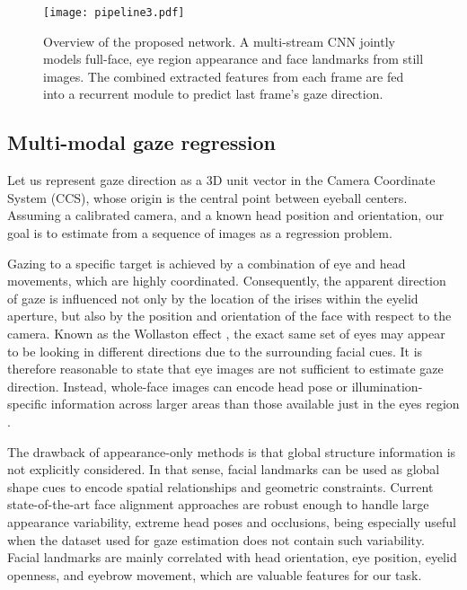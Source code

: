 \documentclass{bmvc2k}
\begin{document}
\begin{figure}
	\begin{center}
		\texttt{[image: pipeline3.pdf]}
	\end{center}
	\caption{Overview of the proposed network. A multi-stream CNN jointly models full-face, eye region appearance and face landmarks from still images. The combined extracted features from each frame are fed into a recurrent module to predict last frame's gaze direction.}
	\label{fig:architecture}\end{figure}


\subsection{Multi-modal gaze regression}

Let us represent gaze direction as a 3D unit vector  in the Camera Coordinate System (CCS), whose origin is the central point between eyeball centers. Assuming a calibrated camera, and a known head position and orientation, our goal is to estimate  from a sequence of images  as a regression problem. 

Gazing to a specific target is achieved by a combination of eye and head movements, which are highly coordinated. Consequently, the apparent direction of gaze is influenced not only by the location of the irises within the eyelid aperture, but also by the position and orientation of the face with respect to the camera. Known as the Wollaston effect \cite{wollaston1824xiii}, the exact same set of eyes may appear to be looking in different directions due to the surrounding facial cues. It is therefore reasonable to state that eye images are not sufficient to estimate gaze direction. Instead, whole-face images can encode head pose or illumination-specific information across larger areas than those available just in the eyes region \cite{zhang2017s, krafka2016eye}. 

The drawback of appearance-only methods is that global structure information is not explicitly considered. In that sense, facial landmarks can be used as global shape cues to encode spatial relationships and geometric constraints. Current state-of-the-art face alignment approaches are robust enough to handle large appearance variability, extreme head poses and occlusions, being especially useful when the dataset used for gaze estimation does not contain such variability. Facial landmarks are mainly correlated with head orientation, eye position, eyelid openness, and eyebrow movement, which are valuable features for our task. 
\end{document}
